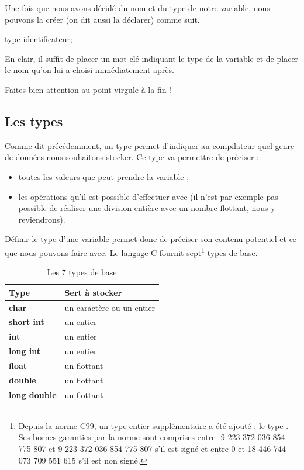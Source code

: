 Une fois que nous avons décidé du nom et du type de notre variable,
nous pouvons la créer (on dit aussi la déclarer) comme suit.

\begin{C}
type identificateur;
\end{C}

En clair, il suffit de placer un mot-clé indiquant le type de la
variable et de placer le nom qu'on lui a choisi immédiatement après.

\begin{attentionbox}
  Faites bien attention au point-virgule à la fin !
\end{attentionbox}

\subsection{Les types}
\label{les-types}

Comme dit précédemment, un type permet d'indiquer au compilateur quel
genre de données nous souhaitons stocker. Ce type va permettre de
préciser :

\begin{itemize}
\item
  toutes les valeurs que peut prendre la variable ;
\item les opérations qu'il est possible d'effectuer avec (il n'est par
  exemple pas possible de réaliser une division entière avec un nombre
  flottant, nous y reviendrons).
\end{itemize}

Définir le type d'une variable permet donc de préciser son contenu
potentiel et ce que nous pouvons faire avec. Le langage C fournit
sept\footnote{\footnotesize{Depuis la norme C99, un type entier
    supplémentaire a été ajouté : le type . Ses
    bornes garanties par la norme sont comprises entre -9 223 372 036
    854 775 807 et 9 223 372 036 854 775 807 s'il est signé et entre 0
    et 18 446 744 073 709 551 615 s'il est non signé.}} types de base.

\begin{table}[ht!]
\centering
{}
\begin{tabular}{|l|l|}\hline
\rowcolor{gris-tab-entete}\textbf{Type} & \textbf{Sert à stocker}\tabularnewline\hline
\textbf{char} & un caractère ou un entier\tabularnewline\hline
\textbf{short int} & un entier\tabularnewline\hline
\textbf{int} & un entier\tabularnewline\hline
\textbf{long int} & un entier\tabularnewline\hline
\textbf{float} & un flottant\tabularnewline\hline
\textbf{double} & un flottant\tabularnewline\hline
\textbf{long double} & un flottant\tabularnewline\hline
\end{tabular}
\caption{Les 7 types de base}
\end{table}

